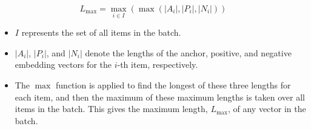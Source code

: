 \begin{equation}
L_{\text{max}} = \max_{i \in I} \left( \max \left( |A_i|, |P_i|, |N_i| \right) \right)
\end{equation}

\begin{itemize}
    \item $I$ represents the set of all items in the batch.
    \item $|A_i|$, $|P_i|$, and $|N_i|$ denote the lengths of the anchor, positive, and negative embedding vectors for the $i$-th item, respectively.
    \item The $\max$ function is applied to find the longest of these three lengths for each item, and then the maximum of these maximum lengths is taken over all items in the batch. This gives the maximum length, $L_{\text{max}}$, of any vector in the batch.
    \end{itemize}

\newpage